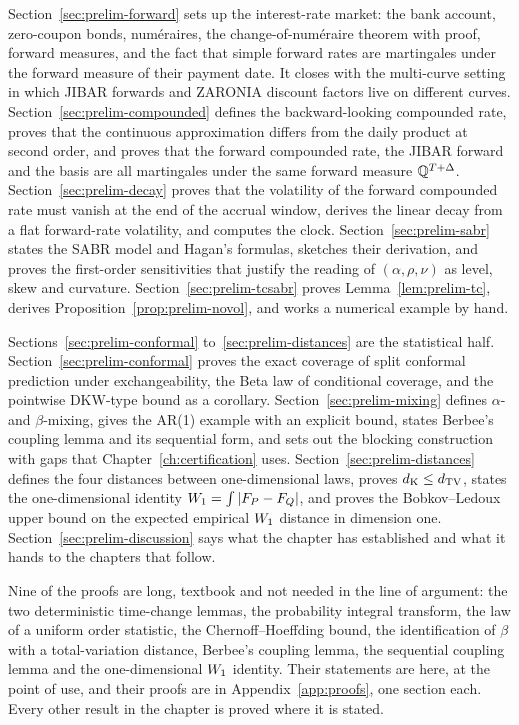 \documentclass[../../../main.tex]{subfiles}
\begin{document}
Section~\ref{sec:prelim-forward} sets up the interest-rate market: the bank account, zero-coupon bonds, num\'eraires, the change-of-num\'eraire theorem with proof, forward measures, and the fact that simple forward rates are martingales under the forward measure of their payment date. It closes with the multi-curve setting in which JIBAR forwards and ZARONIA discount factors live on different curves. Section~\ref{sec:prelim-compounded} defines the backward-looking compounded rate, proves that the continuous approximation differs from the daily product at second order, and proves that the forward compounded rate, the JIBAR forward and the basis are all martingales under the same forward measure $\mathbb{Q}^{T+\Delta}$. Section~\ref{sec:prelim-decay} proves that the volatility of the forward compounded rate must vanish at the end of the accrual window, derives the linear decay from a flat forward-rate volatility, and computes the clock. Section~\ref{sec:prelim-sabr} states the SABR model and Hagan's formulas, sketches their derivation, and proves the first-order sensitivities that justify the reading of $(\alpha,\rho,\nu)$ as level, skew and curvature. Section~\ref{sec:prelim-tcsabr} proves Lemma~\ref{lem:prelim-tc}, derives Proposition~\ref{prop:prelim-novol}, and works a numerical example by hand.

Sections~\ref{sec:prelim-conformal} to~\ref{sec:prelim-distances} are the statistical half. Section~\ref{sec:prelim-conformal} proves the exact coverage of split conformal prediction under exchangeability, the Beta law of conditional coverage, and the pointwise DKW-type bound as a corollary. Section~\ref{sec:prelim-mixing} defines $\alpha$- and $\beta$-mixing, gives the AR(1) example with an explicit bound, states Berbee's coupling lemma and its sequential form, and sets out the blocking construction with gaps that Chapter~\ref{ch:certification} uses. Section~\ref{sec:prelim-distances} defines the four distances between one-dimensional laws, proves $d_{\mathrm{K}}\le d_{\mathrm{TV}}$, states the one-dimensional identity $W_1=\int|F_P-F_Q|$, and proves the Bobkov--Ledoux upper bound on the expected empirical $W_1$ distance in dimension one. Section~\ref{sec:prelim-discussion} says what the chapter has established and what it hands to the chapters that follow.

Nine of the proofs are long, textbook and not needed in the line of argument: the two deterministic time-change lemmas, the probability integral transform, the law of a uniform order statistic, the Chernoff--Hoeffding bound, the identification of $\beta$ with a total-variation distance, Berbee's coupling lemma, the sequential coupling lemma and the one-dimensional $W_1$ identity. Their statements are here, at the point of use, and their proofs are in Appendix~\ref{app:proofs}, one section each. Every other result in the chapter is proved where it is stated.
\end{document}
